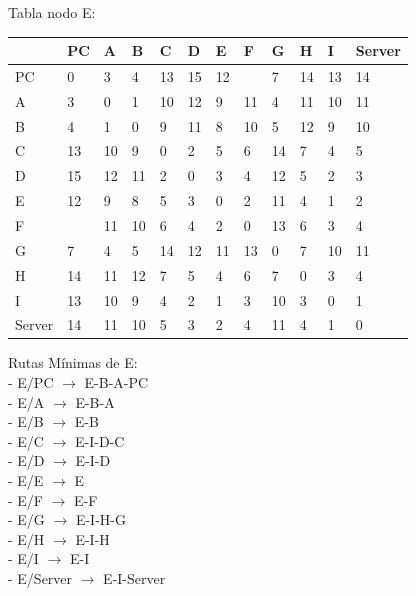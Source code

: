 \documentclass[a4paper]{article}
\begin{document}
\begin{table}[ht]
Tabla nodo E:\\
\begin{tabular}{|l|l|l|l|l|l|l|l|l|l|l|l|}
\hline
       & PC & A  & B & C & D & E & F & G & H & I  & Server \\ \hline
PC     & 0  & 3  & 4 & 13& 15& 12&   & 7 & 14& 13 & 14     \\ \hline
A      & 3  & 0  & 1 & 10& 12& 9 & 11& 4 & 11& 10 & 11     \\ \hline
B      & 4  & 1  & 0 & 9 & 11& 8 & 10& 5 & 12& 9  & 10     \\ \hline
C      & 13 & 10 & 9 & 0 & 2 & 5 & 6 & 14& 7 & 4  & 5      \\ \hline
D      & 15 & 12 & 11& 2 & 0 & 3 & 4 & 12& 5 & 2  & 3      \\ \hline
E      & 12 & 9  & 8 & 5 & 3 & 0 & 2 & 11& 4 & 1  & 2      \\ \hline
F      &    & 11 & 10& 6 & 4 & 2 & 0 & 13& 6 & 3  & 4      \\ \hline
G      & 7  & 4  & 5 & 14& 12& 11& 13& 0 & 7 & 10 & 11     \\ \hline
H      & 14 & 11 & 12& 7 & 5 & 4 & 6 & 7 & 0 & 3  & 4      \\ \hline
I      & 13 & 10 & 9 & 4 & 2 & 1 & 3 & 10& 3 & 0  & 1      \\ \hline
Server & 14 & 11 & 10& 5 & 3 & 2 & 4 & 11& 4 & 1  & 0      \\ \hline
\end{tabular}

Rutas Mínimas de E:\\
-	E/PC  $\rightarrow$  E-B-A-PC\\
-	E/A  $\rightarrow$  E-B-A\\
-	E/B  $\rightarrow$  E-B\\
-	E/C  $\rightarrow$  E-I-D-C\\
-	E/D  $\rightarrow$  E-I-D\\
-	E/E  $\rightarrow$  E\\
-	E/F  $\rightarrow$  E-F\\
-	E/G  $\rightarrow$ E-I-H-G\\
-	E/H  $\rightarrow$  E-I-H\\
-	E/I  $\rightarrow$  E-I\\
-	E/Server  $\rightarrow$  E-I-Server\\
\end{table}

\clearpage
\end{document}
